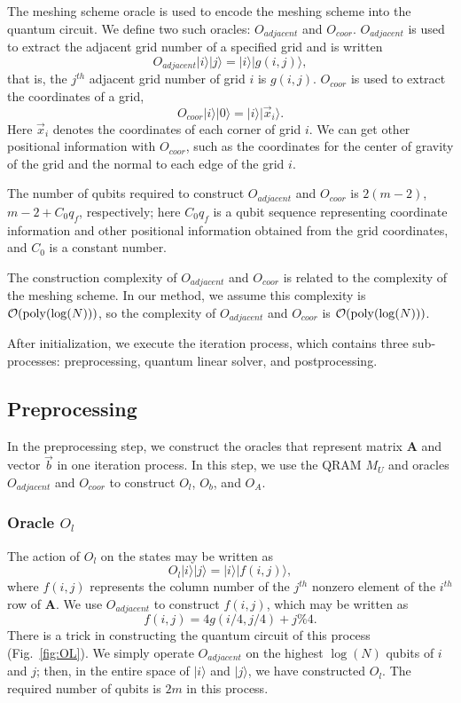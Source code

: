 \documentclass[%
 reprint,
 amsmath,amssymb,
pra,
]{revtex4-1}
\begin{document}
The meshing scheme oracle is used to encode the meshing scheme into the quantum circuit. We define two such oracles: $O_{adjacent}$ and $O_{coor}$. $O_{adjacent}$ is used to extract the adjacent grid number of a specified grid and is written
\begin{equation}
O_{adjacent}|i\rangle|j\rangle=|i\rangle|g(i,j)\rangle,
\end{equation}
that is, the $j^{th}$ adjacent grid number of grid $i$ is $g(i,j)$. $O_{coor}$ is used to extract the coordinates of a grid,
\begin{equation}
O_{coor}|i\rangle|0\rangle=|i\rangle|\vec{x}_i\rangle.
\end{equation}
Here $\vec{x}_i$ denotes the coordinates of each corner of grid $i$. We can get other positional information with $O_{coor}$, such as the coordinates for the center of gravity of the grid and the normal to each edge of the grid $i$.

The number of qubits required to construct $O_{adjacent}$ and $O_{coor}$ is $2(m-2)$, $m-2+C_0q_f$, respectively; here $C_0q_f$ is a qubit sequence representing coordinate information and other positional information obtained from the grid coordinates, and $C_0$ is a constant number.

The construction complexity of $O_{adjacent}$ and $O_{coor}$ is related to the complexity of the meshing scheme. In our method, we assume this complexity is $\mathcal{O}({\rm poly}(\log(N)))$, so the complexity of $O_{adjacent}$ and $O_{coor}$ is $\mathcal{O}({\rm poly}(\log(N)))$. 

After initialization, we execute the iteration process, which contains three sub-processes: preprocessing, quantum linear solver, and postprocessing.

\subsection{Preprocessing}
In the preprocessing step, we construct the oracles that represent matrix $\bm{A}$ and vector $\vec{b}$ in one iteration process. In this step, we use the QRAM $M_U$ and oracles $O_{adjacent}$ and $O_{coor}$ to construct $O_l$, $O_b$, and $O_A$.

\subsubsection{Oracle $O_l$}
The action of $O_l$ on the states may be written as
\begin{equation}
O_l|i\rangle|j\rangle=|i\rangle|f(i,j)\rangle,
\end{equation}
where $f(i,j)$ represents the column number of the $j^{th}$ nonzero element of the $i^{th}$ row of $\bm{A}$. We use $O_{adjacent}$ to construct $f(i,j)$, which may be written as
\begin{equation}
f(i,j)=4g(i/4,j/4)+j\%4.
\end{equation}
There is a trick in constructing the quantum circuit of this process (Fig.~\ref{fig:OL}). We simply operate $O_{adjacent}$ on the highest $\log(N)$ qubits of $i$ and $j$; then, in the entire space of $|i\rangle$ and $|j\rangle$, we have constructed $O_l$. The required number of qubits is $2m$ in this process.
\end{document}
